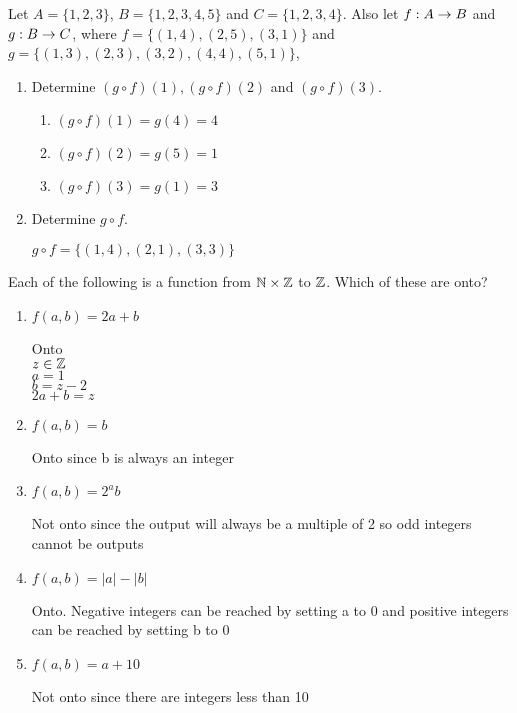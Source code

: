 \documentclass{homework}
\begin{document}
\question Let $A = \{1, 2, 3\}$, $B = \{1, 2, 3, 4, 5\}$ and $C = \{1, 2, 3, 4\}$. \smallbreak Also let $f : A \rightarrow B$ and $g : B \rightarrow C$, \smallbreak where $f = \{(1, 4), (2, 5), (3, 1)\}$ and $g = \{(1, 3), (2, 3), (3, 2), (4, 4), (5, 1)\}$,
\begin{enumerate}[label=(\alph*)] \bigbreak
    \item Determine $(g \circ f )(1), (g \circ f )(2)$ and $(g \circ f )(3)$.
      \begin{sol}
        \begin{enumerate}
            \item $(g \circ f)(1)=g(4)=4$
            \item $(g \circ f)(2)=g(5)=1$
            \item $(g \circ f)(3)=g(1)=3$
        \end{enumerate}
      \end{sol}
    \item Determine $g \circ f$.
      \begin{sol}
          $g \circ f = \{(1,4),(2,1),(3,3)\}$
      \end{sol}
\end{enumerate}

\question Each of the following is a function from $\mathbb{N} \times \mathbb{Z}$ to $\mathbb{Z}$. Which of these are onto?
\begin{enumerate}[label=(\alph*)]
    \item $f(a, b) = 2a + b$
      \begin{sol}
        Onto \\
          $z \in \mathbb{Z}$  \\
          $a=1$\\
          $b=z-2$\\
          $2a+b=z$
      \end{sol} 
    \item $f(a, b) = b$
      \begin{sol}
        Onto since b is always an integer
      \end{sol}
    \item $f(a, b) = 2^ab$
      \begin{sol}
        Not onto since the output will always be a multiple of 2 so odd integers cannot be outputs
      \end{sol}
    \item $f(a, b) = |a|-|b|$
      \begin{sol}
        Onto. Negative integers can be reached by setting a to 0 and positive integers can be reached by setting b to 0
      \end{sol}
    \item $f(a, b) = a+10$
      \begin{sol}
        Not onto since there are integers less than 10
      \end{sol}
\end{enumerate}
\end{document}
